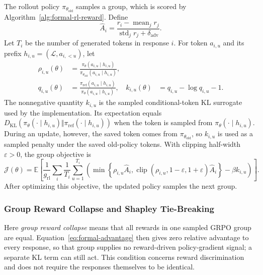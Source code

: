 The rollout policy \(\pi_{\theta_{\mathrm{old}}}\) samples a group, which is
scored by Algorithm~\ref{alg:formal-rl-reward}.  Define
\begin{equation}
  \widehat A_i=
  \frac{r_i-\operatorname{mean}_{j}r_j}
       {\operatorname{std}_{j}r_j+\delta_{\mathrm{adv}}}.
  \label{eq:formal-advantage}
\end{equation}
Let \(T_i\) be the number of generated tokens in response \(i\).  For token
\(a_{i,u}\) and its prefix \(h_{i,u}=(\mathcal L,a_{i,<u})\), let
\begin{align}
  \rho_{i,u}(\theta)
  &=\frac{\pi_\theta(a_{i,u}\mid h_{i,u})}
          {\pi_{\theta_{\mathrm{old}}}(a_{i,u}\mid h_{i,u})},
  \label{eq:formal-token-ratio}\\
  q_{i,u}(\theta)
  &=\frac{\pi_{\mathrm{ref}}(a_{i,u}\mid h_{i,u})}
          {\pi_\theta(a_{i,u}\mid h_{i,u})},
  &k_{i,u}(\theta)&=q_{i,u}-\log q_{i,u}-1.
  \label{eq:formal-token-kl}
\end{align}
The nonnegative quantity \(k_{i,u}\) is the sampled conditional-token KL
surrogate used by the implementation.  Its expectation equals
\(D_{\mathrm{KL}}(\pi_\theta(\cdot\mid h_{i,u})\Vert
\pi_{\mathrm{ref}}(\cdot\mid h_{i,u}))\) when the token is sampled from
\(\pi_\theta(\cdot\mid h_{i,u})\).  During an update, however, the saved token
comes from \(\pi_{\theta_{\mathrm{old}}}\), so \(k_{i,u}\) is used as a
sampled penalty under the saved old-policy tokens.
With clipping half-width \(\varepsilon>0\), the group objective is
\begin{equation}
  \mathcal J(\theta)=\mathbb E\!\left[
  \frac{1}{g_{\mathrm{rl}}}\sum_i\frac{1}{T_i}\sum_{u=1}^{T_i}
  \left(
  \min\!\left\{\rho_{i,u}\widehat A_i,
  \operatorname{clip}(\rho_{i,u},1-\varepsilon,1+\varepsilon)\widehat A_i
  \right\}-\beta k_{i,u}\right)\right].
  \label{eq:formal-grpo}
\end{equation}
After optimizing this objective, the updated policy samples the next group.

\subsubsection{Group Reward Collapse and Shapley Tie-Breaking}
\label{app:formal-reward-collapse}

Here \emph{group reward collapse} means that all rewards in one sampled
GRPO group are equal.  Equation~\eqref{eq:formal-advantage} then gives zero
relative advantage to every response, so that group supplies no
reward-driven policy-gradient signal; a separate KL term can still act.
This condition concerns reward discrimination and does not require the
responses themselves to be identical.

